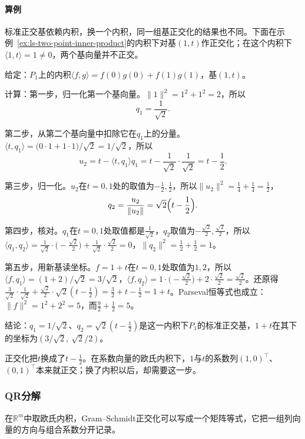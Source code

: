 \paragraph{算例}
标准正交基依赖内积，换一个内积，同一组基正交化的结果也不同。下面在示例~\ref{ex:ls-two-point-inner-product}的内积下对基$(1,t)$作正交化；在这个内积下$\langle1,t\rangle=1\neq0$，两个基向量并不正交。
\begin{example}
\label{ex:ls-gram-schmidt-two-point}
给定：$P_1$上的内积$\langle f,g\rangle=f(0)g(0)+f(1)g(1)$，基$(1,t)$。

计算：第一步，归一化第一个基向量。$\lVert1\rVert^2=1^2+1^2=2$，所以
\[
 q_1=\frac1{\sqrt2}.
\]

第二步，从第二个基向量中扣除它在$q_1$上的分量。$\langle t,q_1\rangle=\bigl(0\cdot1+1\cdot1\bigr)/\sqrt2=1/\sqrt2$，所以
\[
 u_2=t-\langle t,q_1\rangle q_1=t-\frac1{\sqrt2}\cdot\frac1{\sqrt2}=t-\frac12.
\]

第三步，归一化。$u_2$在$t=0,1$处的取值为$-\tfrac12,\tfrac12$，所以$\lVert u_2\rVert^2=\tfrac14+\tfrac14=\tfrac12$，
\[
 q_2=\frac{u_2}{\lVert u_2\rVert}=\sqrt2\Bigl(t-\frac12\Bigr).
\]

第四步，核对。$q_1$在$t=0,1$处取值都是$\tfrac1{\sqrt2}$，$q_2$取值为$-\tfrac{\sqrt2}2,\tfrac{\sqrt2}2$，所以$\langle q_1,q_2\rangle=\tfrac1{\sqrt2}\cdot\bigl(-\tfrac{\sqrt2}2\bigr)+\tfrac1{\sqrt2}\cdot\tfrac{\sqrt2}2=0$，$\lVert q_2\rVert^2=\tfrac12+\tfrac12=1$。

第五步，用新基读坐标。$f=1+t$在$t=0,1$处取值为$1,2$，所以$\langle f,q_1\rangle=(1+2)/\sqrt2=3/\sqrt2$，$\langle f,q_2\rangle=1\cdot\bigl(-\tfrac{\sqrt2}2\bigr)+2\cdot\tfrac{\sqrt2}2=\tfrac{\sqrt2}2$。还原得$\tfrac3{\sqrt2}\cdot\tfrac1{\sqrt2}+\tfrac{\sqrt2}2\cdot\sqrt2(t-\tfrac12)=\tfrac32+t-\tfrac12=1+t$。Parseval恒等式也成立：$\lVert f\rVert^2=1^2+2^2=5$，而$\tfrac92+\tfrac12=5$。

结论：$q_1=1/\sqrt2$、$q_2=\sqrt2(t-\tfrac12)$是这一内积下$P_1$的标准正交基，$1+t$在其下的坐标为$(3/\sqrt2,\ \sqrt2/2)$。
\end{example}
正交化把$t$换成了$t-\tfrac12$。在系数向量的欧氏内积下，$1$与$t$的系数列$(1,0)^\top$、$(0,1)^\top$本来就正交；换了内积以后，却需要这一步。

\subsubsection{QR分解}

在$\mathbb R^m$中取欧氏内积，Gram--Schmidt正交化可以写成一个矩阵等式，它把一组列向量的方向与组合系数分开记录。

